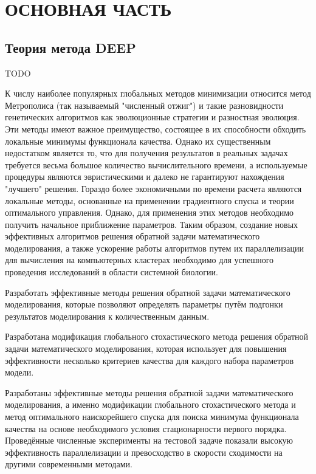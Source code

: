 \setcounter{figure}{0} \setcounter{table}{0} \setcounter{equation}{0}
\chapter*{ОСНОВНАЯ ЧАСТЬ}
\section*{Теория метода DEEP}
TODO

К числу наиболее популярных глобальных методов минимизации относится метод Метрополиса (так называемый "численный отжиг") и такие разновидности генетических алгоритмов как эволюционные стратегии и разностная эволюция. Эти методы имеют важное преимущество, состоящее в их способности обходить локальные минимумы функционала качества. Однако их существенным недостатком является то, что для получения результатов в реальных задачах требуется весьма большое количество вычислительного времени, а используемые процедуры являются эвристическими и далеко не гарантируют нахождения "лучшего" решения. Гораздо более экономичными по времени расчета являются локальные методы, основанные на применении градиентного спуска и теории оптимального управления. Однако, для применения этих методов необходимо получить начальное приближение параметров. Таким образом, создание новых эффективных алгоритмов решения обратной задачи математического моделирования, а также ускорение работы алгоритмов путем их параллелизации для вычисления на компьютерных кластерах необходимо для успешного проведения исследований в области системной биологии.

Разработать эффективные методы решения обратной задачи математического моделирования, которые позволяют определять параметры путём подгонки результатов моделирования к количественным данным.

Разработана модификация глобального стохастического метода решения обратной задачи математического моделирования, которая использует для повышения эффективности несколько критериев качества для каждого набора параметров модели.

Разработаны эффективные методы решения обратной задачи математического моделирования, а именно модификации глобального стохастического метода и метод оптимального наискорейшего спуска для поиска минимума функционала качества на основе необходимого условия стационарности первого порядка. Проведённые численные эксперименты на тестовой задаче показали высокую эффективность параллелизации и превосходство в скорости сходимости на другими современными методами.

